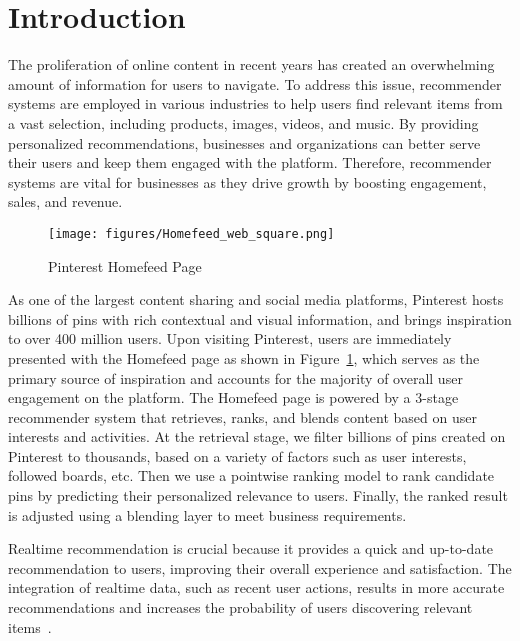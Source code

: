 \section{Introduction}


The proliferation of online content in recent years has created an overwhelming amount of information for users to navigate. 
To address this issue, recommender systems are employed  in various industries to help users find relevant items from a vast selection, including products, images, videos, and music. 
By providing personalized recommendations, businesses and organizations can better serve their users and keep them engaged with the platform. 
Therefore, recommender systems are vital for businesses as they drive growth by boosting engagement, sales, and revenue.

\begin{figure}[!ht]
  \centering
  \texttt{[image: figures/Homefeed\_web\_square.png]}
  \caption{Pinterest Homefeed Page}
  \label{fig:hf}
\end{figure}

As one of the largest content sharing and social media platforms, Pinterest hosts billions of pins with rich contextual and visual information, and brings inspiration to over 400 million users. 
Upon visiting Pinterest, users are immediately presented with the Homefeed page as shown in Figure~\ref{fig:hf}, which serves as the primary source of inspiration and accounts for the majority of overall user engagement on the platform.
The Homefeed page is powered by a 3-stage recommender system that retrieves, ranks, and blends content based on user interests and activities. 
At the retrieval stage, we filter billions of pins created on Pinterest to thousands, based on a variety of factors such as user interests, followed boards, etc. Then we use a pointwise ranking model to rank candidate pins by predicting their personalized relevance to users. 
Finally, the ranked result is adjusted using a blending layer to meet business requirements.


Realtime recommendation is crucial because it provides a quick and up-to-date recommendation to users, improving their overall experience and satisfaction. 
The integration of realtime data, such as recent user actions, results in more accurate recommendations and increases the probability of users discovering relevant items~\cite{alibaba_seq_tfmr, pi2020search}.


